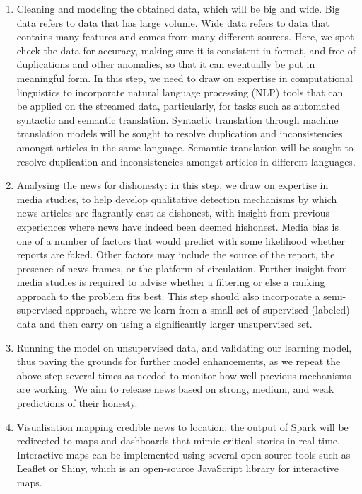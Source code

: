 \begin{enumerate}
\item Cleaning and modeling the obtained data, which will be big and wide. Big data refers to data that has large volume. Wide data refers to data that contains many features and comes from many different sources. Here, we spot check the data for accuracy, making sure it is consistent in format, and free of duplications and other anomalies, so that it can eventually be put in meaningful form. In this step, we need to draw on expertise in computational linguistics to incorporate natural language processing (NLP) tools that can be applied on the streamed data, particularly, for tasks such as automated syntactic and semantic translation. Syntactic translation through machine translation models will be sought to resolve duplication and inconsistencies amongst articles in the same language. Semantic translation will be sought to resolve duplication and inconsistencies amongst articles in different languages. 
\item Analysing the news for dishonesty: in this step, we draw on expertise in media studies, to help develop qualitative detection mechanisms by which news articles are flagrantly cast as dishonest, with insight from previous experiences where news have indeed been deemed hishonest. Media bias is one of a number of factors that would predict with some likelihood whether reports are faked. Other factors may include the source of the report, the presence of news frames, or the platform of circulation. Further insight from media studies is required to advise whether a filtering or else a ranking approach to the problem fits best. This step should also incorporate a semi-supervised approach, where we learn from a small set of supervised (labeled) data and then carry on using a significantly larger unsupervised set. 
\item Running the model on unsupervised data, and validating our learning model, thus paving the grounds for further model enhancements, as we repeat the above step several times as needed to monitor how well previous mechanisms are working. We aim to release news based on strong, medium, and weak predictions of their honesty.
\item Visualisation mapping credible news to location: the output of Spark will be redirected to maps and dashboards that mimic critical stories in real-time. Interactive maps can be implemented using several open-source tools such as Leaflet or Shiny, which is an open-source JavaScript library for interactive maps. 
\end{enumerate}


